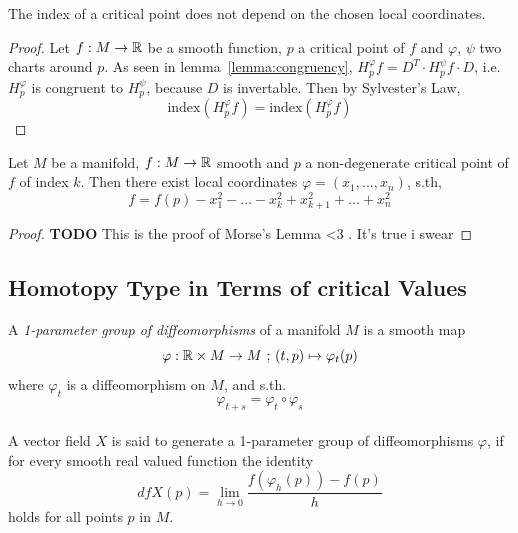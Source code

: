 \documentclass[a4paper,11pt]{article}
\begin{document}
\begin{lemma}
   \label{lemma:index}
   The index of a critical point does not depend on the chosen local coordinates.
\end{lemma}

\begin{proof}
   Let $f: M \rightarrow {\mathbb R}$ be a smooth function, $p$ a critical point of $f$
   and $\varphi$, $\psi$ two charts around $p$.
   As seen in lemma~\ref{lemma:congruency}, 
   $H_p^{\varphi}f = D^T \cdot H_p^{\psi}f \cdot D$, i.e.
   $H_p^{\varphi}$ is congruent to $H_p^{\psi}$, because $D$ is invertable. 
   Then by Sylvester's Law, 
   \[ \text{{index}}(H_p^{\varphi}f) = \text{{index}}(H_p^{\varphi}f) \]
\end{proof}

\begin{theorem}
   \label{theorem:morse lemma}

   Let $M$ be a manifold, $f: M \rightarrow {\mathbb R}$ smooth and $p$ a non-degenerate 
   critical point of $f$ of index $k$. Then there exist local coordinates 
   $\varphi = (x_1, ..., x_n)$, s.th,
   \[ f = f(p) - x_1^2 - ... - x_k^2 + x_{k+1}^2 + ... + x_n^2 \]
\end{theorem}

\begin{proof}
   \textbf{TODO}
   This is the proof of Morse's Lemma <3 . It's true i swear
\end{proof}

\subsection{Homotopy Type in Terms of critical Values}

\begin{definition}
   \label{def:1-param group}
   A \textit{1-parameter group of diffeomorphisms} of a manifold $M$ is a 
   smooth map
   \[ \varphi: {\mathbb R} \times M \rightarrow M \text{ ; } (t, p) \mapsto \varphi_t(p) \]
   where $ \varphi_t $ is a diffeomorphism on $M$, and s.th. 
   \[ \varphi_{t+s} = \varphi_t \circ \varphi_s \] \\
   A vector field $X$ is said to generate a 1-parameter group of diffeomorphisms 
   $ \varphi $, if for every smooth real valued function the identity 
   \[ dfX(p) = \lim_{h \to 0} \frac{f(\varphi_h(p)) - f(p)}{h} \]
   holds for all points $p$ in $M$.
\end{definition}
\end{document}
